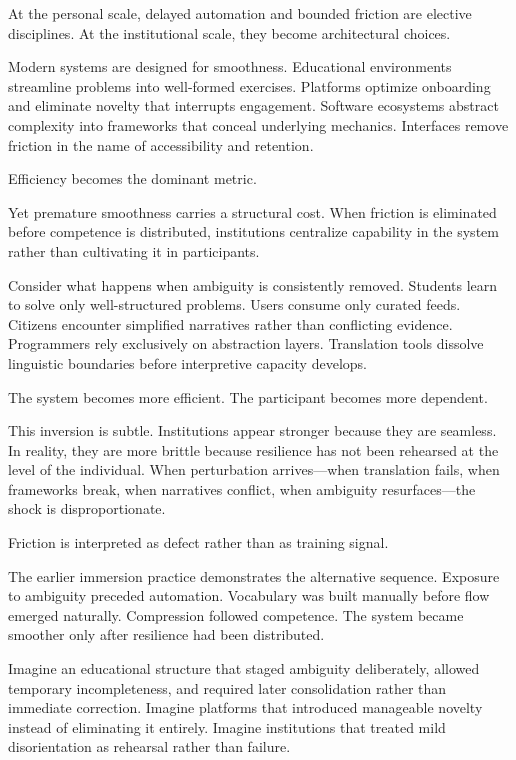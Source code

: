 \documentclass[12pt]{article}
\begin{document}
At the personal scale, delayed automation and bounded friction are elective disciplines. At the institutional scale, they become architectural choices.

Modern systems are designed for smoothness. Educational environments streamline problems into well-formed exercises. Platforms optimize onboarding and eliminate novelty that interrupts engagement. Software ecosystems abstract complexity into frameworks that conceal underlying mechanics. Interfaces remove friction in the name of accessibility and retention.

Efficiency becomes the dominant metric.

Yet premature smoothness carries a structural cost. When friction is eliminated before competence is distributed, institutions centralize capability in the system rather than cultivating it in participants.

Consider what happens when ambiguity is consistently removed. Students learn to solve only well-structured problems. Users consume only curated feeds. Citizens encounter simplified narratives rather than conflicting evidence. Programmers rely exclusively on abstraction layers. Translation tools dissolve linguistic boundaries before interpretive capacity develops.

The system becomes more efficient. The participant becomes more dependent.

This inversion is subtle. Institutions appear stronger because they are seamless. In reality, they are more brittle because resilience has not been rehearsed at the level of the individual. When perturbation arrives—when translation fails, when frameworks break, when narratives conflict, when ambiguity resurfaces—the shock is disproportionate.

Friction is interpreted as defect rather than as training signal.

The earlier immersion practice demonstrates the alternative sequence. Exposure to ambiguity preceded automation. Vocabulary was built manually before flow emerged naturally. Compression followed competence. The system became smoother only after resilience had been distributed.

Imagine an educational structure that staged ambiguity deliberately, allowed temporary incompleteness, and required later consolidation rather than immediate correction. Imagine platforms that introduced manageable novelty instead of eliminating it entirely. Imagine institutions that treated mild disorientation as rehearsal rather than failure.
\end{document}
